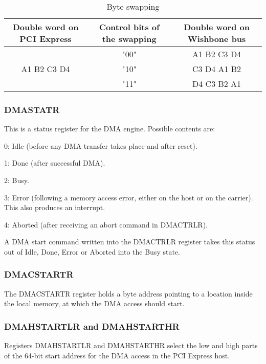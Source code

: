 \documentclass[10pt,a4paper]{cerndoc}
\begin{document}
\begin{table}[htbp]
  \centering
  \begin{tabular}{|c|c|c|}                                                      \hline
    Double word on PCI Express & Control bits of the swapping & Double word on Wishbone bus           \\ \hline \hline
     \multirow{3}{*}{A1 B2 C3 D4}
                         &  "00"         &  A1 B2 C3 D4                         \\ \cline{2-3}
                         &  "10"         &  C3 D4 A1 B2                         \\ \cline{2-3}
                         &  "11"         &  D4 C3 B2 A1                         \\ \hline

  \end{tabular}
  \caption{Byte swapping}
  \label{tab:byte_swapping}
\end{table}

\subsubsection{DMASTATR}
This is a status register for the DMA engine. Possible contents are:
\begin{packed_item}
\item 0: Idle (before any DMA transfer takes place and after reset).
\item 1: Done (after successful DMA).
\item 2: Busy.
\item 3: Error (following a memory access error, either on the host or on the carrier). This also produces an interrupt.
\item 4: Aborted (after receiving an abort command in DMACTRLR).
\end{packed_item}
A DMA start command written into the DMACTRLR register takes this status out of Idle, Done, Error or Aborted into the Busy state.

\subsubsection{DMACSTARTR}
The DMACSTARTR register holds a byte address pointing to a location inside the local memory, at which the DMA access should start.

\subsubsection{DMAHSTARTLR and DMAHSTARTHR}
Registers DMAHSTARTLR and DMAHSTARTHR select the low and high parts of the 64-bit start address for the DMA access in the PCI Express host. 
\end{document}
